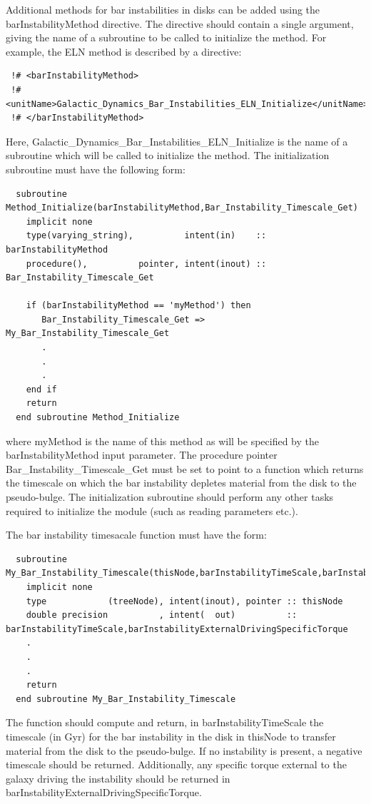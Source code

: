 Additional methods for bar instabilities in disks can be added using the {\normalfont \ttfamily barInstabilityMethod} directive. The directive should contain a single argument, giving the name of a subroutine to be called to initialize the method. For example, the {\normalfont \ttfamily ELN} method is described by a directive:
\begin{verbatim}
 !# <barInstabilityMethod>
 !#  <unitName>Galactic_Dynamics_Bar_Instabilities_ELN_Initialize</unitName>
 !# </barInstabilityMethod>
\end{verbatim}
Here, {\normalfont \ttfamily Galactic\_Dynamics\_Bar\_Instabilities\_ELN\_Initialize} is the name of a subroutine which will be called to initialize the method. The initialization subroutine must have the following form:
\begin{verbatim}
  subroutine Method_Initialize(barInstabilityMethod,Bar_Instability_Timescale_Get)
    implicit none
    type(varying_string),          intent(in)    :: barInstabilityMethod
    procedure(),          pointer, intent(inout) :: Bar_Instability_Timescale_Get
    
    if (barInstabilityMethod == 'myMethod') then
       Bar_Instability_Timescale_Get => My_Bar_Instability_Timescale_Get
       .
       .
       .
    end if
    return
  end subroutine Method_Initialize
\end{verbatim}
where {\normalfont \ttfamily myMethod} is the name of this method as will be specified by the {\normalfont \ttfamily barInstabilityMethod} input parameter. The procedure pointer {\normalfont \ttfamily Bar\_Instability\_Timescale\_Get} must be set to point to a function which returns the timescale on which the bar instability depletes material from the disk to the pseudo-bulge. The initialization subroutine should perform any other tasks required to initialize the module (such as reading parameters etc.).

The bar instability timesacale function must have the form:
\begin{verbatim}
  subroutine My_Bar_Instability_Timescale(thisNode,barInstabilityTimeScale,barInstabilityExternalDrivingSpecificTorque)
    implicit none
    type            (treeNode), intent(inout), pointer :: thisNode
    double precision          , intent(  out)          :: barInstabilityTimeScale,barInstabilityExternalDrivingSpecificTorque
    .
    .
    .
    return
  end subroutine My_Bar_Instability_Timescale
\end{verbatim}
The function should compute and return, in {\normalfont \ttfamily barInstabilityTimeScale} the timescale (in Gyr) for the bar instability in the disk in {\normalfont \ttfamily thisNode} to transfer material from the disk to the pseudo-bulge. If no instability is present, a negative timescale should be returned. Additionally, any specific torque external to the galaxy driving the instability should be returned in {\normalfont \ttfamily barInstabilityExternalDrivingSpecificTorque}.

